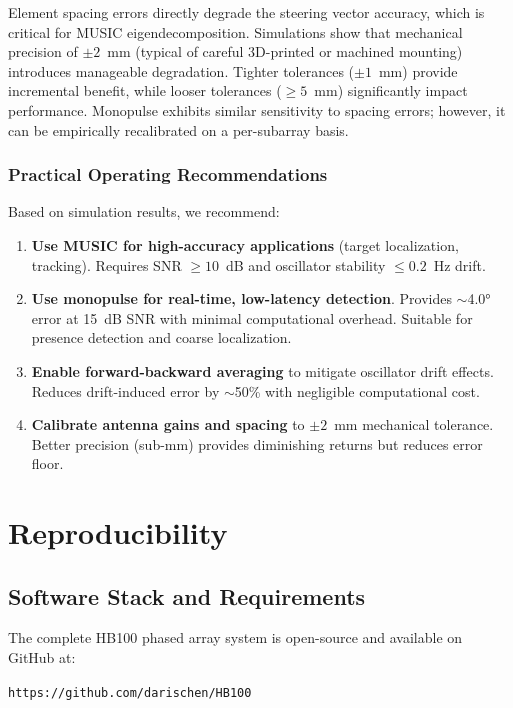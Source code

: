 \documentclass[10pt,a4paper]{article}
\begin{document}
Element spacing errors directly degrade the steering vector accuracy, which is critical for MUSIC eigendecomposition.
Simulations show that mechanical precision of $\pm 2$~mm (typical of careful 3D-printed or machined mounting) introduces
manageable degradation. Tighter tolerances ($\pm 1$~mm) provide incremental benefit, while looser tolerances ($\geq 5$~mm)
significantly impact performance. Monopulse exhibits similar sensitivity to spacing errors; however, it can be empirically
recalibrated on a per-subarray basis.

\subsubsection{Practical Operating Recommendations}

Based on simulation results, we recommend:

\begin{enumerate}
\item \textbf{Use MUSIC for high-accuracy applications} (target localization, tracking).
  Requires SNR $\geq 10$~dB and oscillator stability $\leq 0.2$~Hz drift.

\item \textbf{Use monopulse for real-time, low-latency detection}.
  Provides $\sim$4.0° error at 15~dB SNR with minimal computational overhead.
  Suitable for presence detection and coarse localization.

\item \textbf{Enable forward-backward averaging} to mitigate oscillator drift effects.
  Reduces drift-induced error by $\sim$50\% with negligible computational cost.

\item \textbf{Calibrate antenna gains and spacing} to $\pm 2$~mm mechanical tolerance.
  Better precision (sub-mm) provides diminishing returns but reduces error floor.
\end{enumerate}

\section{Reproducibility}
\label{sec:repro}

\subsection{Software Stack and Requirements}

The complete HB100 phased array system is open-source and available on GitHub at:
\begin{center}
\texttt{https://github.com/darischen/HB100}
\end{center}
\end{document}
